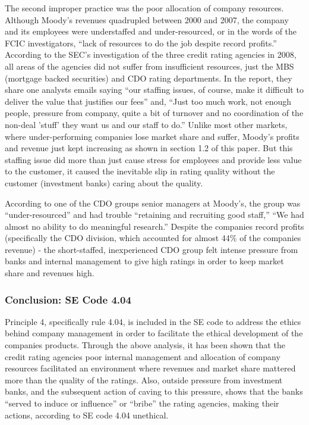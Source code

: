 \documentclass[11pt]{article}
\begin{document}
\begin{multicols}{2}
The second improper practice was the poor allocation of company resources.  Although Moody's revenues quadrupled between 2000 and 2007, the company and its employees were understaffed and under-resourced, or in the words of the FCIC investigators, ``lack of resources to do the job despite record profits.'' \cite[p.xxv]{govtReport}  According to the SEC's investigation of the three credit rating agencies in 2008, all areas of the agencies did not suffer from insufficient resources, just the MBS (mortgage backed securities) and CDO rating departments. \cite{secCRAreport}  In the report, they share one analysts emails saying ``our staffing issues, of course, make it difficult to deliver the value that justifies our fees'' and, ``Just too much work, not enough people, pressure from company, quite a bit of turnover and no coordination of the non-deal 'stuff' they want us and our staff to do.'' \cite{secCRAreport}  Unlike most other markets, where under-performing companies lose market share and suffer, Moody's profits and revenue just kept increasing as shown in section 1.2 of this paper.  But this staffing issue did more than just cause stress for employees and provide less value to the customer, it caused the inevitable slip in rating quality without the customer (investment banks) caring about the quality.   

According to one of the CDO groups senior managers at Moody's, the group was ``under-resourced'' and had trouble ``retaining and recruiting good staff,''  ``We had almost no ability to do meaningful research.'' \cite[p.149]{govtReport}  Despite the companies record profits (specifically the CDO division, which accounted for almost 44\% of the companies revenue) - the short-staffed, inexperienced CDO group felt intense pressure from banks and internal management to give high ratings in order to keep market share and revenues high. \cite[p.149-150]{govtReport}

\subsubsection{Conclusion: SE Code 4.04}

Principle 4, specifically rule 4.04, is included in the SE code to address the ethics behind company management in order to facilitate the ethical development of the companies products.  Through the above analysis, it has been shown that the credit rating agencies poor internal management and allocation of company resources facilitated an environment where revenues and market share mattered more than the quality of the ratings.  Also, outside pressure from investment banks, and the subsequent action of caving to this pressure, shows that the banks ``served to induce or influence'' or ``bribe'' the rating agencies, making their actions, according to SE code 4.04 unethical.


\end{multicols}
\end{document}
